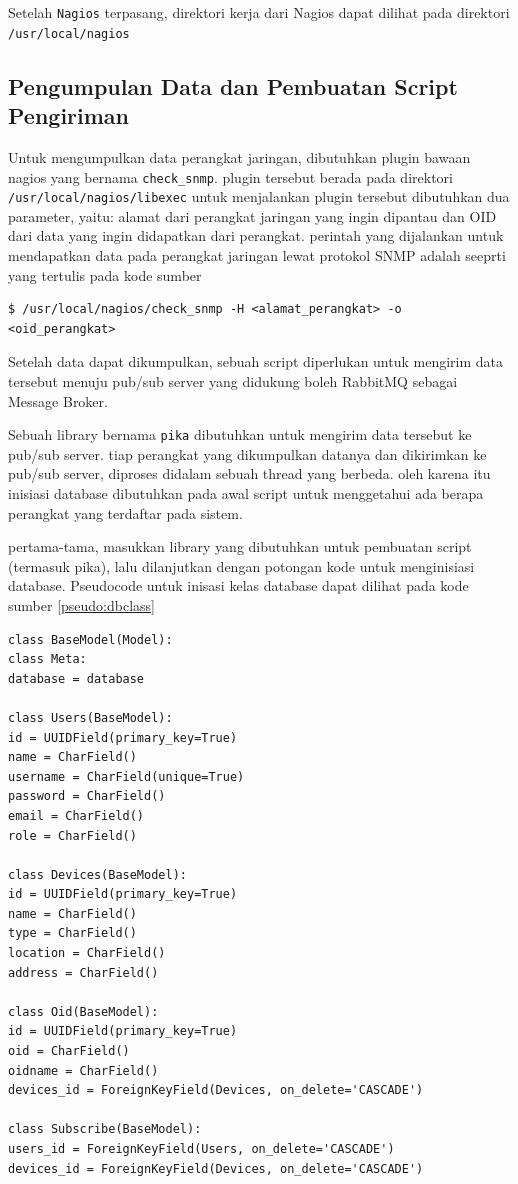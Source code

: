     			Setelah \texttt{Nagios} terpasang, direktori kerja dari Nagios dapat dilihat pada direktori \texttt{/usr/local/nagios}

			\subsection{Pengumpulan Data dan Pembuatan Script Pengiriman}
				Untuk mengumpulkan data perangkat jaringan, dibutuhkan plugin bawaan nagios yang bernama \texttt{check\_snmp}. plugin tersebut berada pada direktori \texttt{/usr/local/nagios/libexec} untuk menjalankan plugin tersebut dibutuhkan dua parameter, yaitu: alamat dari perangkat jaringan yang ingin dipantau dan OID dari data yang ingin didapatkan dari perangkat.
				perintah yang dijalankan untuk mendapatkan data pada perangkat jaringan lewat protokol SNMP adalah seeprti yang tertulis pada kode sumber 
				
\begin{lstlisting}[frame=single,breaklines,caption={Perintah Mengumpulkan Data Perangkat dengan SNMP},label=snmpcommand, captionpos=b]
$ /usr/local/nagios/check_snmp -H <alamat_perangkat> -o <oid_perangkat>
\end{lstlisting}
    			
    			Setelah data dapat dikumpulkan, sebuah script diperlukan untuk mengirim data tersebut menuju pub/sub server yang didukung boleh RabbitMQ sebagai Message Broker.
    			
    			Sebuah library bernama \texttt{pika} dibutuhkan untuk mengirim data tersebut ke pub/sub server. tiap perangkat yang dikumpulkan datanya dan dikirimkan ke pub/sub server, diproses didalam sebuah thread yang berbeda. oleh karena itu inisiasi database dibutuhkan pada awal script untuk menggetahui ada berapa perangkat yang terdaftar pada sistem.
    			
    			pertama-tama, masukkan library yang dibutuhkan untuk pembuatan script (termasuk pika), lalu dilanjutkan dengan potongan kode untuk menginisiasi database. Pseudocode untuk inisasi kelas database dapat dilihat pada kode sumber \ref{pseudo:dbclass}
    			
\begin{lstlisting}[frame=single,breaklines,caption={Pseudocode inisiasi Kelas Database},label=pseudo:dbclass, captionpos=b]
class BaseModel(Model):
class Meta:
database = database

class Users(BaseModel):
id = UUIDField(primary_key=True)
name = CharField()
username = CharField(unique=True)
password = CharField()
email = CharField()
role = CharField()

class Devices(BaseModel):
id = UUIDField(primary_key=True)
name = CharField()
type = CharField()
location = CharField()
address = CharField()

class Oid(BaseModel):
id = UUIDField(primary_key=True)
oid = CharField()
oidname = CharField()
devices_id = ForeignKeyField(Devices, on_delete='CASCADE')

class Subscribe(BaseModel):
users_id = ForeignKeyField(Users, on_delete='CASCADE')
devices_id = ForeignKeyField(Devices, on_delete='CASCADE')
\end{lstlisting}
    			
